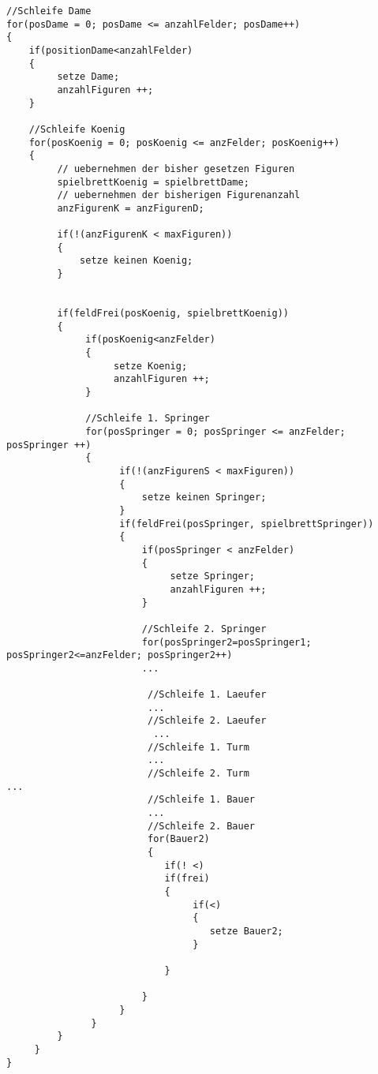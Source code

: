 \documentclass[
	12pt,
	a4paper,
	BCOR10mm,
	DIV14,
	listof=totoc,
	bibliography=totoc,
	headsepline
]{scrreprt}
\begin{document}
\begin{lstlisting}[caption={Erzeugung der Spielbretter}, label={lst:example1}]
//Schleife Dame
for(posDame = 0; posDame <= anzahlFelder; posDame++)
{	
	if(positionDame<anzahlFelder)
    {
         setze Dame;
         anzahlFiguren ++;
    }
    
    //Schleife Koenig
    for(posKoenig = 0; posKoenig <= anzFelder; posKoenig++)
    {	
    	 // uebernehmen der bisher gesetzen Figuren
         spielbrettKoenig = spielbrettDame;
         // uebernehmen der bisherigen Figurenanzahl
         anzFigurenK = anzFigurenD;
                    
         if(!(anzFigurenK < maxFiguren))
         {
             setze keinen Koenig;
         }
                    
                    
         if(feldFrei(posKoenig, spielbrettKoenig))
         {
              if(posKoenig<anzFelder)
              {
                   setze Koenig;
                   anzahlFiguren ++;
              }
              
              //Schleife 1. Springer 	
              for(posSpringer = 0; posSpringer <= anzFelder; posSpringer ++)
              {
              		if(!(anzFigurenS < maxFiguren))
              		{
              			setze keinen Springer;
              		}
              		if(feldFrei(posSpringer, spielbrettSpringer))
         			{
              			if(posSpringer < anzFelder)
              			{
                  			 setze Springer;
                  			 anzahlFiguren ++;
              			}
              		
              			//Schleife 2. Springer
              			for(posSpringer2=posSpringer1; posSpringer2<=anzFelder; posSpringer2++)
              			...
              			
              		 	 //Schleife 1. Laeufer
           			 	 ...
       				 	 //Schleife 2. Laeufer
          				  ...
               		 	 //Schleife 1. Turm
           			 	 ...
       				 	 //Schleife 2. Turm	          				 	 							 ...
              		 	 //Schleife 1. Bauer
       				 	 ... 
              			 //Schleife 2. Bauer
              			 for(Bauer2)
              			 {
              				if(! <)
              				if(frei)
              				{
              					 if(<)
              				 	 { 
              				 	 	setze Bauer2;
              				 	 }
              				 	 
              				}
              			
              			}
              	 	}
               }
         }
     }
}
\end{lstlisting}
 
\end{document}
